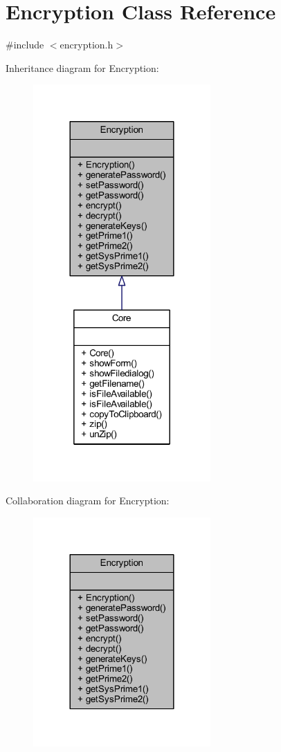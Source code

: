 \hypertarget{class_encryption}{}\section{Encryption Class Reference}
\label{class_encryption}


{\ttfamily \#include $<$encryption.\+h$>$}



Inheritance diagram for Encryption\+:\nopagebreak
\begin{figure}[H]
\begin{center}
\leavevmode
\includegraphics[width=192pt]{class_encryption__inherit__graph}
\end{center}
\end{figure}


Collaboration diagram for Encryption\+:\nopagebreak
\begin{figure}[H]
\begin{center}
\leavevmode
\includegraphics[width=192pt]{class_encryption__coll__graph}
\end{center}
\end{figure}
